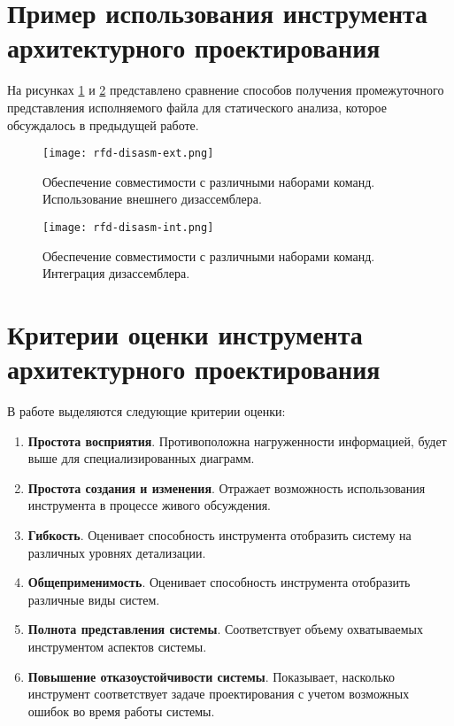 \documentclass[listings]{labreport}
\begin{document}
\section*{Пример использования инструмента архитектурного проектирования}

На рисунках \ref{fig:disasm-ext} и \ref{fig:disasm-int} представлено сравнение
способов получения промежуточного представления исполняемого файла для статического анализа,
которое обсуждалось в предыдущей работе.

\begin{landscape}
\vspace*{\fill}
\begin{figure}[H]
\centering
\texttt{[image: rfd-disasm-ext.png]}
\caption{\small{Обеспечение совместимости с различными наборами команд.
    Использование внешнего дизассемблера.}}
\label{fig:disasm-ext}
\end{figure}
\vfill
\end{landscape}

\begin{landscape}
\vspace*{\fill}
\begin{figure}[H]
\centering
\texttt{[image: rfd-disasm-int.png]}
\caption{\small{Обеспечение совместимости с различными наборами команд.
   Интеграция дизассемблера.}}
\label{fig:disasm-int}
\end{figure}
\vfill
\end{landscape}

\section*{Критерии оценки инструмента архитектурного проектирования}

В работе выделяются следующие критерии оценки:
\begin{enumerate}[noitemsep,topsep=0em]
\item \textbf{Простота восприятия}. Противоположна нагруженности информацией, будет выше
  для специализированных диаграмм.
\item \textbf{Простота создания и изменения}. Отражает возможность использования инструмента в
  процессе живого обсуждения.
\item \textbf{Гибкость}. Оценивает способность инструмента отобразить систему
  на различных уровнях детализации.
\item \textbf{Общеприменимость}. Оценивает способность инструмента отобразить различные виды систем.
\item \textbf{Полнота представления системы}. Соответствует объему охватываемых инструментом аспектов системы.
\item \textbf{Повышение отказоустойчивости системы}. Показывает, насколько инструмент соответствует задаче
  проектирования с учетом возможных ошибок во время работы системы.
\end{enumerate}
\end{document}
